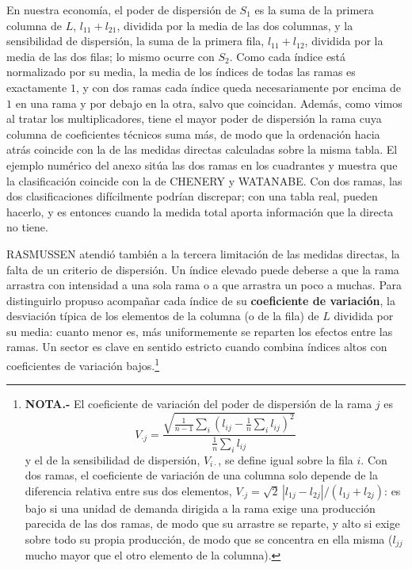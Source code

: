 \documentclass[10pt,a4paper]{article}
\newcounter{anexo}
\begin{document}
En nuestra economía, el poder de dispersión de $S_1$ es la suma de la primera columna de $L$, $l_{11}+l_{21}$, dividida por la media de las dos columnas, y la sensibilidad de dispersión, la suma de la primera fila, $l_{11}+l_{12}$, dividida por la media de las dos filas; lo mismo ocurre con $S_2$. Como cada índice está normalizado por su media, la media de los índices de todas las ramas es exactamente $1$, y con dos ramas cada índice queda necesariamente por encima de $1$ en una rama y por debajo en la otra, salvo que coincidan. Además, como vimos al tratar los multiplicadores, tiene el mayor poder de dispersión la rama cuya columna de coeficientes técnicos suma más, de modo que la ordenación hacia atrás coincide con la de las medidas directas calculadas sobre la misma tabla. El ejemplo numérico del anexo sitúa las dos ramas en los cuadrantes y muestra que la clasificación coincide con la de CHENERY y WATANABE. Con dos ramas, las dos clasificaciones difícilmente podrían discrepar; con una tabla real, pueden hacerlo, y es entonces cuando la medida total aporta información que la directa no tiene.

RASMUSSEN atendió también a la tercera limitación de las medidas directas, la falta de un criterio de dispersión. Un índice elevado puede deberse a que la rama arrastra con intensidad a una sola rama o a que arrastra un poco a muchas. Para distinguirlo propuso acompañar cada índice de su \textbf{coeficiente de variación}, la desviación típica de los elementos de la columna (o de la fila) de $L$ dividida por su media: cuanto menor es, más uniformemente se reparten los efectos entre las ramas. Un sector es clave en sentido estricto cuando combina índices altos con coeficientes de variación bajos.\footnote{%
    \textbf{NOTA.-} El coeficiente de variación del poder de dispersión de la rama $j$ es
    $$V_{\cdot j}=\frac{\sqrt{\frac{1}{n-1}\sum_i\left(l_{ij}-\frac{1}{n}\sum_i l_{ij}\right)^2}}{\frac{1}{n}\sum_i l_{ij}}$$
    y el de la sensibilidad de dispersión, $V_{i\cdot}$, se define igual sobre la fila $i$. Con dos ramas, el coeficiente de variación de una columna solo depende de la diferencia relativa entre sus dos elementos, $V_{\cdot j}=\sqrt{2}\,|l_{1j}-l_{2j}|/(l_{1j}+l_{2j})$: es bajo si una unidad de demanda dirigida a la rama exige una producción parecida de las dos ramas, de modo que su arrastre se reparte, y alto si exige sobre todo su propia producción, de modo que se concentra en ella misma ($l_{jj}$ mucho mayor que el otro elemento de la columna).
}
\end{document}
